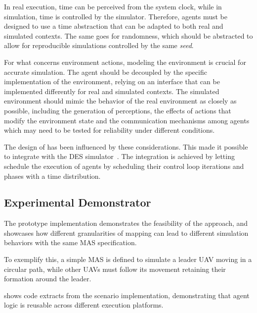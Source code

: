 In real execution, time can be perceived from the system clock, while in simulation, time is controlled by the simulator.
%
Therefore, agents must be designed to use a time abstraction that can be adapted to both real and simulated contexts.
%
The same goes for randomness, which should be abstracted to allow for reproducible simulations controlled by the same \emph{seed}. 

For what concerns environment actions, modeling the environment is crucial for accurate simulation. 
%
The agent should be decoupled by the specific implementation of the environment, relying on an interface that can be implemented differently for real and simulated contexts.
%
The simulated environment should mimic the behavior of the real environment as closely as possible, including the generation of perceptions, the effects of actions that modify the environment state and the communication mechanisms among agents which may need to be tested for reliability under different conditions. 

The design of \jakta{} has been influenced by these considerations.
%
This made it possible to integrate \jakta{} with the \alchemist{} \ac{DES} simulator~\cite{PianiniJOS2013}.
%
The integration is achieved by letting \alchemist{} schedule the execution of \jakta{} agents by scheduling their control loop iterations and phases with a time distribution.
%


\subsection{Experimental Demonstrator}

The prototype implementation demonstrates the feasibility of the approach, and showcases how different granularities of mapping can lead to different simulation behaviors with the same \ac{MAS} specification.

To exemplify this, a simple \ac{MAS} is defined to simulate a leader \ac{UAV} moving in a circular path, while other \acp{UAV}
must follow its movement retaining their formation around the leader.

 shows code extracts from the scenario implementation, demonstrating that agent logic is reusable across different execution platforms.

